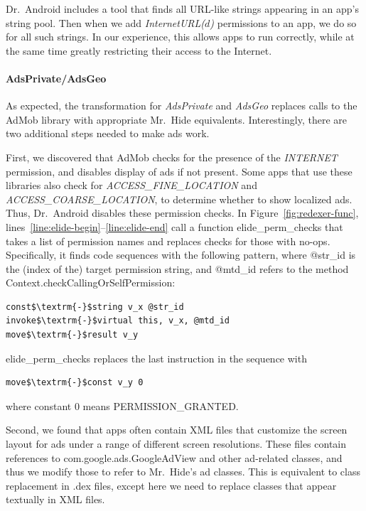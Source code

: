 \documentclass[preprint]{sig-alternate-10pt}
\newcommand{\code}[1]{\textsf{#1}}
\newcommand{\lib}{Mr.\ Hide\xspace}
\newcommand{\rewriter}{Dr.\ Android\xspace}
\newcommand{\perm}[1]{\textsf{\textit{#1}}}
\begin{document}
\rewriter includes a tool that finds all URL-like strings appearing in
an app's string pool. Then when we add \perm{InternetURL($d$)}
permissions to an app, we do so for all such strings. In our
experience, this allows apps to run correctly, while at the same time
greatly restricting their access to the Internet. 

\paragraph*{AdsPrivate/AdsGeo}
As expected, the transformation for \perm{AdsPrivate} and \perm{AdsGeo}
replaces calls to the AdMob library with
appropriate \lib{} equivalents. Interestingly, there are two
additional steps needed to make ads work.

First, we discovered that AdMob checks
for the presence of the \perm{INTERNET} permission, and disables
display of ads if not present. Some apps that use these libraries also
check for \perm{ACCESS\_FINE\_LOCATION} and
\perm{ACCESS\_COARSE\_LOCATION}, to determine whether to show
localized ads.  Thus, \rewriter disables these permission checks.  In
Figure~\ref{fig:redexer-func},
lines~\ref{line:elide-begin}--\ref{line:elide-end} call a function
\code{elide\_perm\_checks} that takes a list of permission names and
replaces checks for those with no-ops. Specifically, it finds code
sequences with the following pattern, where \code{@str\_id} is the
(index of the) target permission string, and \code{@mtd\_id} refers to
the method \code{Context.checkCallingOrSelfPermission}:
\begin{lstlisting}[xleftmargin=1em]
const$\textrm{-}$string v_x @str_id
invoke$\textrm{-}$virtual this, v_x, @mtd_id
move$\textrm{-}$result v_y
\end{lstlisting}
\code{elide\_perm\_checks} replaces the last instruction in the sequence with
\begin{lstlisting}[xleftmargin=1em]
move$\textrm{-}$const v_y 0
\end{lstlisting}
where constant 0 means \code{PERMISSION\_GRANTED}.

Second, we found that apps often contain XML files that
customize the screen layout for ads under a range of different screen
resolutions. These files contain references to 
\code{com.google.ads.GoogleAdView} and other ad-related classes, and
thus we modify those to refer to \lib's ad classes.
This is equivalent to class replacement in
\code{.dex} files, except here we need to replace
classes that appear textually in XML files.
\end{document}
